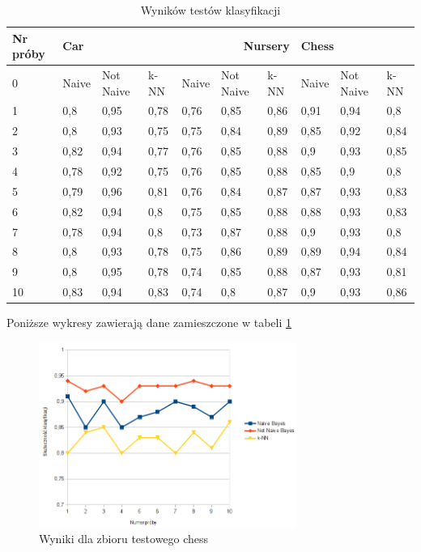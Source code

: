 \documentclass[paper=a4, fontsize=11pt]{scrartcl} %
\numberwithin{equation}{section} %
\numberwithin{figure}{section} %
\numberwithin{table}{section} %
\begin{document}
\begin{table}[!h]
\caption{Wyników testów klasyfikacji}
\label{tab:tabela}
\begin{tabular}{|l|l|l|l|l|l|l|l|l|l|}
  \hline 
  Nr próby & \multicolumn{3}{l|}{Car} & \multicolumn{3}{r|}{Nursery} & \multicolumn{3}{l|}{Chess} \\ \hline
  0 & Naive & Not Naive & k-NN  & Naive & Not Naive & k-NN & Naive & Not Naive & k-NN \\ \hline
  1 & 0,8 &	0,95 &0,78 &0,76	&0,85&0,86 & 0,91	&0,94	&0,8\\
  2 & 0,8 &	0,93 &0,75 &0,75&0,84&0,89&0,85&0,92	&0,84\\
  3 &0,82 & 0,94 &0,77&0,76&0,85&0,88&0,9&	0,93&	0,85\\
  4 &0,78 &	0,92	 &0,75&0,76&0,85&0,88&0,85&	0,9&	0,8\\
  5 &0,79 &	0,96 &0,81&0,76&	0,84&	0,87& 0,87&	0,93	&0,83\\
  6 &0,82 & 0,94	 &0,8&0,75&	0,85	&0,88&0,88&	0,93	&0,83\\
  7 &0,78 &	0,94 &0,8&0,73&	0,87	&0,88&0,9	&0,93	&0,8\\
  8 &0,8  &	0,93 &0,78&0,75&0,86&0,89&0,89	&0,94	&0,84\\
  9 &0,8 & 0,95 & 0,78&0,74&0,85&0,88&0,87&	0,93	&0,81\\
  10&0,83& 0,94 &0,83&0,74&0,8&0,87&0,9&	0,93	&0,86\\

  \hline
\end{tabular} 
\end{table}

Poniższe wykresy zawierają dane zamieszczone w tabeli \ref{tab:tabela}

\begin{figure}[!h]
 \centering
\includegraphics[width=0.75\textwidth]{chess.png}
 \caption{Wyniki dla zbioru testowego chess}
 \label{fig:model_drzewa}
\end{figure}
\end{document}
